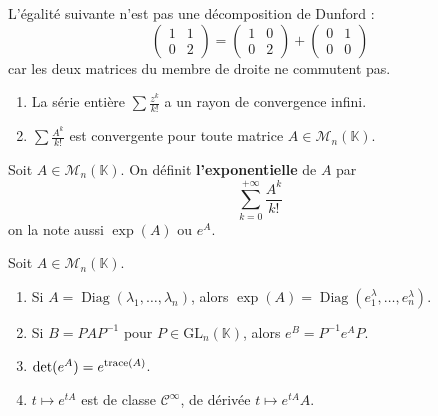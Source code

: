   \begin{cexample}
    L'égalité suivante n'est pas une décomposition de Dunford :
    \[ \begin{pmatrix} 1 & 1 \\ 0 & 2 \end{pmatrix} = \begin{pmatrix} 1 & 0 \\ 0 & 2 \end{pmatrix} + \begin{pmatrix} 0 & 1 \\ 0 & 0 \end{pmatrix} \]
    car les deux matrices du membre de droite ne commutent pas.
  \end{cexample}
  
  
  \begin{lemma}
    \begin{enumerate}[label=(\roman*)]
      \item La série entière $\sum \frac{z^k}{k!}$ a un rayon de convergence infini.
      \item $\sum \frac{A^k}{k!}$ est convergente pour toute matrice $A \in \mathcal{M}_n(\mathbb{K})$.
    \end{enumerate}
  \end{lemma}
  
  \begin{definition}
    Soit $A \in \mathcal{M}_n(\mathbb{K})$. On définit \textbf{l'exponentielle} de $A$ par
    \[ \sum_{k=0}^{+\infty} \frac{A^k}{k!} \]
    on la note aussi $\exp(A)$ ou $e^A$.
  \end{definition}
  
  \begin{theorem}
    Soit $A \in \mathcal{M}_n(\mathbb{K})$.
    \begin{enumerate}[label=(\roman*)]
      \item Si $A = \operatorname{Diag}(\lambda_1, \dots, \lambda_n)$, alors $\exp(A) = \operatorname{Diag}(e^\lambda_1, \dots, e^\lambda_n)$.
      \item Si $B = PAP^{-1}$ pour $P \in \mathrm{GL}_n(\mathbb{K})$, alors $e^B = P^{-1} e^A P$.
      \item $\det(e^A) = e^{\operatorname{trace}(A)}$.
      \item $t \mapsto e^{tA}$ est de classe $\mathcal{C}^\infty$, de dérivée $t \mapsto e^{tA}A$.
    \end{enumerate}
  \end{theorem}
  
